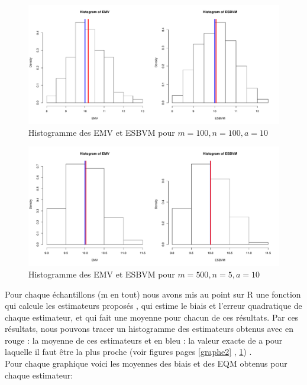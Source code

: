 \documentclass[12pt]{article}
\begin{document}
\begin{enumerate}
\begin{figure}[H]
\centering
\includegraphics[width=1.0\textwidth]{figures/GraphP2Q34.pdf}
\caption{Histogramme des EMV et ESBVM pour $m=100, n=100, a=10$}
\label{graphe5}
\end{figure}

\begin{figure}[H]
\centering
\includegraphics[width=1.0\textwidth]{figures/GraphP2Q35.pdf}
\caption{Histogramme des EMV et ESBVM pour $m=500, n=5, a=10$}
\label{graphe6}
\end{figure}

Pour chaque \'{e}chantillons (m en tout) nous avons mis au point sur R une fonction qui calcule les estimateurs propos\'{e}s , qui estime le biais et l'erreur quadratique de chaque estimateur, et qui fait une moyenne pour chacun de ces r\'{e}sultats. Par ces r\'{e}sultats, nous pouvons tracer un histogramme des estimateurs obtenus avec en rouge : la moyenne de ces estimateurs et en bleu : la valeur exacte de a pour laquelle il faut \^{e}tre la plus proche (voir figures pages \ref{graphe2} , \ref{graphe5})  .
\\

Pour chaque graphique voici les moyennes des biais et des EQM obtenus pour chaque estimateur:
\\
\begin{center}


\end{center}
\end{enumerate}
\end{document}
